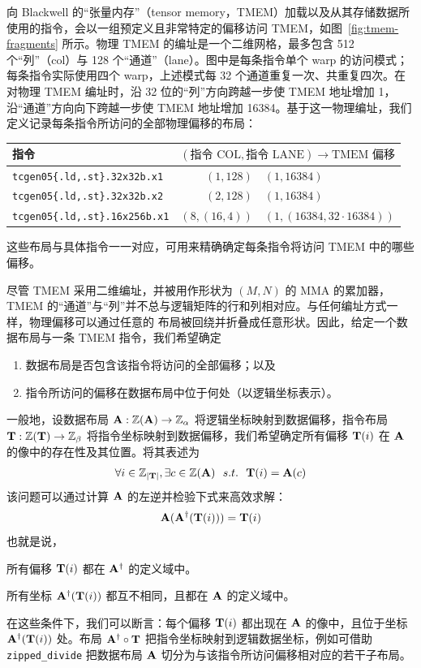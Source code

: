 向 Blackwell 的“张量内存”（tensor memory，TMEM）加载以及从其存储数据所使用的指令，会以一组预定义且非常特定的偏移访问 TMEM，如图~\ref{fig:tmem-fragments} 所示。物理 TMEM 的编址是一个二维网格，最多包含 512 个“列”（col）与 128 个“通道”（lane）。图中是每条指令单个 warp 的访问模式；每条指令实际使用四个 warp，上述模式每 32 个通道重复一次、共重复四次。在对物理 TMEM 编址时，沿 32 位的“列”方向跨越一步使 TMEM 地址增加 1，沿“通道”方向向下跨越一步使 TMEM 地址增加 16384。基于这一物理编址，我们定义记录每条指令所访问的全部物理偏移的布局：
\begin{center}
\begin{tabular}{l | r@{:}l}
\quad\quad\quad\quad \textbf{指令} & \multicolumn{2}{c}{$(\text{指令 COL}, \text{指令 LANE}) \to \text{TMEM 偏移}$} \\
\hline
\texttt{tcgen05\{.ld,.st\}.32x32b.x1} & $(1,128)$ & $(1,16384)$ \\
\texttt{tcgen05\{.ld,.st\}.32x32b.x2} & $(2,128)$ & $(1,16384)$ \\
\texttt{tcgen05\{.ld,.st\}.16x256b.x1} & $(8,(16,4))$ & $(1,(16384,32\cdot 16384))$ \\
\end{tabular}
\end{center}
这些布局与具体指令一一对应，可用来精确确定每条指令将访问 TMEM 中的哪些偏移。

尽管 TMEM 采用二维编址，并被用作形状为 $(M,N)$ 的 MMA 的累加器，TMEM 的“通道”与“列”并不总与逻辑矩阵的行和列相对应。与任何编址方式一样，物理偏移可以通过任意的 \CuTe{} 布局被回绕并折叠成任意形状。因此，给定一个数据布局与一条 TMEM 指令，我们希望确定
\begin{enumerate}[itemsep=0pt,topsep=2pt]
\item 数据布局是否包含该指令将访问的全部偏移；以及
\item 指令所访问的偏移在数据布局中位于何处（以逻辑坐标表示）。
\end{enumerate}

一般地，设数据布局 $\mathbf{A} : \mathbb{Z}(\mathbf{A}) \to \mathbb{Z}_\alpha$ 将逻辑坐标映射到数据偏移，指令布局 $\mathbf{T} : \mathbb{Z}(\mathbf{T}) \to \mathbb{Z}_\beta$ 将指令坐标映射到数据偏移，我们希望确定所有偏移 $\mathbf{T}(i)$ 在 $\mathbf{A}$ 的像中的存在性及其位置。将其表述为
\begin{align*}
\forall i \in \Z_{\abs{\v{T}}}, \exists c \in \Z(\v{A}) \ \ s.t. \ \ \v{T}(i) = \v{A}(c)
\end{align*}
该问题可以通过计算 $\mathbf{A}$ 的左逆并检验下式来高效求解：
\begin{align*}
\mathbf{A}(\mathbf{A}^\dagger(\mathbf{T}(i))) = \mathbf{T}(i)
\end{align*}
也就是说，
\begin{compactitem}
\item 所有偏移 $\mathbf{T}(i)$ 都在 $\mathbf{A}^\dagger$ 的定义域中。
\item 所有坐标 $\mathbf{A}^\dagger(\mathbf{T}(i))$ 都互不相同，且都在 $\mathbf{A}$ 的定义域中。
\end{compactitem}
在这些条件下，我们可以断言：每个偏移 $\mathbf{T}(i)$ 都出现在 $\mathbf{A}$ 的像中，且位于坐标 $\mathbf{A}^\dagger(\mathbf{T}(i))$ 处。布局 $\mathbf{A}^\dagger \circ \mathbf{T}$ 把指令坐标映射到逻辑数据坐标，例如可借助 {\tt zipped\_divide} 把数据布局 $\mathbf{A}$ 切分为与该指令所访问偏移相对应的若干子布局。
